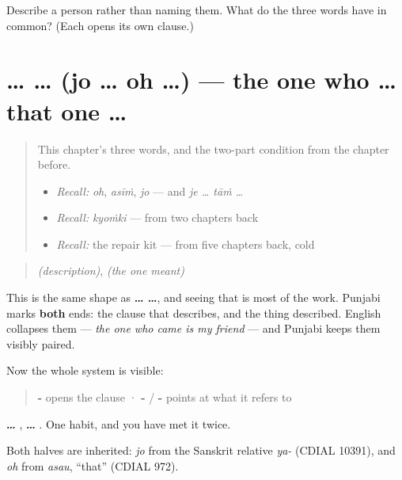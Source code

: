 \begin{tcolorbox}[breakable,colback=teal!4,colframe=teal!35!black,title={Before you move on}]
Describe a person rather than naming them. What do the three \textbf{} words have in common? (Each opens its own clause.)
\end{tcolorbox}
\section[\texorpdfstring{\pa{ਜੋ} … \pa{ਉਹ} … (jo … oh …)}{ਜੋ … ਉਹ … (jo … oh …)}]{ …  … (jo … oh …) — the one who … that one …}

\label{lesson:PA-C42-jo-oh}



\begin{quote}
This chapter's three words, and the two-part condition from the chapter before.

\begin{itemize}
\raggedright
  \item \emph{Recall:} \emph{oh}, \emph{asīṁ}, \emph{jo} — and \emph{je … tāṁ …}
  \item \emph{Recall:} \emph{kyoṁki} — from two chapters back
  \item \emph{Recall:} the repair kit — from five chapters back, cold
\end{itemize}
\end{quote}

\begin{cousinweb}
\begin{quote}
\textbf{} \emph{(description)}, \textbf{} \emph{(the one meant)}
\end{quote}

This is the same shape as \textbf{ …  …}, and seeing that is most of the work. Punjabi marks \textbf{both} ends: the clause that describes, and the thing described. English collapses them — \emph{the one who came is my friend} — and Punjabi keeps them visibly paired.

Now the whole system is visible:

\begin{quote}
\textbf{-} opens the clause · \textbf{-} / \textbf{-} points at what it refers to
\end{quote}

\textbf{ … }, \textbf{ … }. One habit, and you have met it twice.

Both halves are inherited: \emph{jo} from the Sanskrit relative \emph{ya-} (CDIAL 10391), and \emph{oh} from \emph{asau}, \textquotedblleft{}that\textquotedblright{} (CDIAL 972).
\end{cousinweb}

